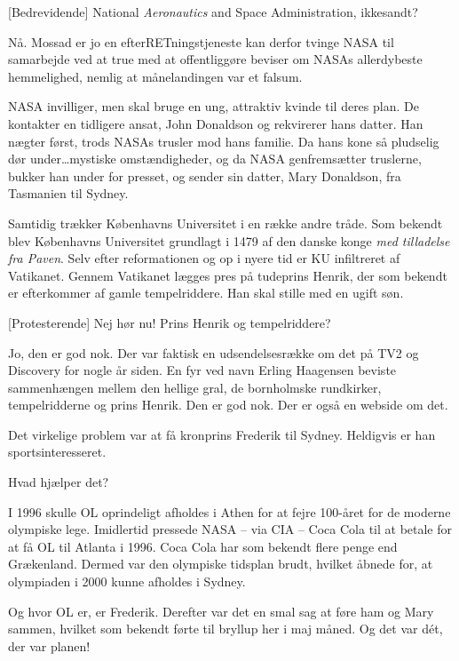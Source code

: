 \documentclass[a4paper,11pt]{article}
\begin{document}
\begin{sketch}
[Bedrevidende] National \emph{Aeronautics} and Space Administration,
ikkesandt?

Nå. Mossad er jo en efterRETningstjeneste kan derfor tvinge NASA til samarbejde
ved at true med at offentliggøre beviser om NASAs allerdybeste hemmelighed,
nemlig at månelandingen var et falsum.

NASA invilliger, men skal bruge en ung, attraktiv kvinde til deres plan. De
kontakter en tidligere ansat, John Donaldson og rekvirerer hans datter. Han
nægter først, trods NASAs trusler mod hans familie. Da hans kone så pludselig
dør under\ldots mystiske omstændigheder, og da NASA genfremsætter truslerne,
bukker han under for presset, og sender sin datter, Mary Donaldson, fra
Tasmanien til Sydney.


Samtidig trækker Københavns Universitet i en række andre tråde. Som bekendt
blev Københavns Universitet grundlagt i 1479 af den danske konge \emph{med
tilladelse fra Paven}. Selv efter reformationen og op i nyere tid er KU
infiltreret af Vatikanet. Gennem Vatikanet lægges pres på tudeprins Henrik,
der som bekendt er efterkommer af gamle tempelriddere. Han skal stille med en
ugift søn.

[Protesterende] Nej hør nu! Prins Henrik og tempelriddere?

 Jo, den er god nok. Der var faktisk en udsendelsesrække om det på TV2
og Discovery for nogle år siden. En fyr ved navn Erling Haagensen beviste sammenhængen
mellem den hellige gral, de bornholmske rundkirker, tempelridderne og prins
Henrik. Den er god nok. Der er også en webside om det.


Det virkelige problem var at få kronprins Frederik til Sydney. Heldigvis er
han sportsinteresseret.

 Hvad hjælper det?

 I 1996 skulle OL oprindeligt afholdes i Athen for at fejre 100-året
for de moderne olympiske lege. Imidlertid pressede NASA -- via CIA -- Coca
Cola til at betale for at få OL til Atlanta i 1996. Coca Cola har som bekendt
flere penge end Grækenland. Dermed var den olympiske tidsplan brudt, hvilket
åbnede for, at olympiaden i 2000 kunne afholdes i Sydney.

Og hvor OL er, er Frederik. Derefter var det en smal sag at føre ham og Mary
sammen, hvilket som bekendt førte til bryllup her i maj måned. Og det var dét,
der var planen!


\end{sketch}
\end{document}
